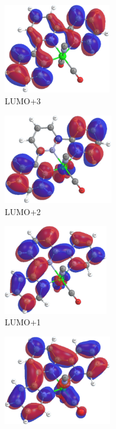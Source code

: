 \begin{figure}[!ht]
 \centering
 \begin{subfigure}[b]{0.31\textwidth}
  \includegraphics[clip=true, width=\textwidth, height=39mm, keepaspectratio]{images/mos/6l+3.eps}
  \caption{LUMO+3}
 \end{subfigure}
 \begin{subfigure}[b]{0.31\textwidth}
  \includegraphics[clip=true, width=\textwidth, height=39mm, keepaspectratio]{images/mos/6l+2.eps}
  \caption{LUMO+2}
 \end{subfigure}
  \begin{subfigure}[b]{0.31\textwidth}
  \includegraphics[clip=true, width=\textwidth, height=39mm, keepaspectratio]{images/mos/6l+1.eps}
  \caption{LUMO+1}
 \end{subfigure}
  \begin{subfigure}[b]{0.31\textwidth}
  \includegraphics[clip=true, width=\textwidth, height=39mm, keepaspectratio]{images/mos/6l.eps}

\end{subfigure}
\end{figure}
